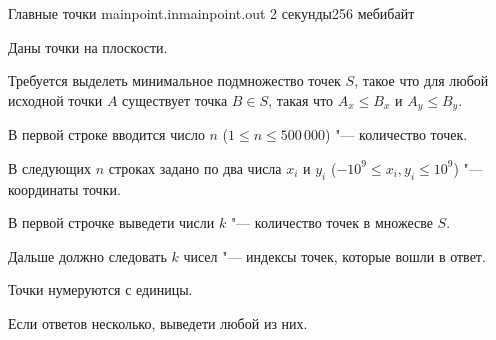 \gdef\thisproblemauthor{Сергей Копелиович}
\gdef\thisproblemdeveloper{Ольга Черникова}
\begin{problem}{Главные точки}
{mainpoint.in}{mainpoint.out}
{2 секунды}{256 мебибайт}{}

Даны точки на плоскости. 

Требуется выделеть минимальное подмножество точек $S$, такое что для любой исходной точки $A$ существует точка $B \in S$,
такая что $A_x \le B_x$ и $A_y \le B_y$.  

\InputFile
В первой строке вводится число $n$
($1 \le n \le 500\,000$) "---
количество точек.

В следующих $n$ строках задано по два числа $x_i$ и $y_i$
($-10^9 \le x_i, y_i \le 10^9$) "---
координаты точки.

\OutputFile 
В первой строчке выведети числи $k$ "--- количество точек в множесве $S$.

Дальше должно следовать $k$ чисел "--- индексы точек, которые вошли в ответ.

Точки нумеруются с единицы.

Если ответов несколько, выведети любой из них. 
\Example

\begin{example}
%
\end{example}

\end{problem}
